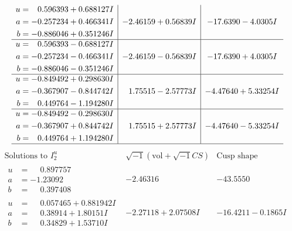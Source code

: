 \documentclass[1p]{elsarticle_modified}
\theoremstyle{definition}
\newcommand{\I}{\sqrt{-1}}
\begin{document}
$$\begin{array}{c|c|c}
\begin{aligned}
u &= \phantom{-}0.596393 + 0.688127 I \\
a &= -0.257234 + 0.466341 I \\
b &= -0.886046 + 0.351246 I\end{aligned}
 & -2.46159 + 0.56839 I & -17.6390 - 4.0305 I \\ \hline\begin{aligned}
u &= \phantom{-}0.596393 - 0.688127 I \\
a &= -0.257234 - 0.466341 I \\
b &= -0.886046 - 0.351246 I\end{aligned}
 & -2.46159 - 0.56839 I & -17.6390 + 4.0305 I \\ \hline\begin{aligned}
u &= -0.849492 + 0.298630 I \\
a &= -0.367907 - 0.844742 I \\
b &= \phantom{-}0.449764 - 1.194280 I\end{aligned}
 & \phantom{-}1.75515 - 2.57773 I & -4.47640 + 5.33254 I \\ \hline\begin{aligned}
u &= -0.849492 - 0.298630 I \\
a &= -0.367907 + 0.844742 I \\
b &= \phantom{-}0.449764 + 1.194280 I\end{aligned}
 & \phantom{-}1.75515 + 2.57773 I & -4.47640 - 5.33254 I\\
 \hline 
 \end{array}$$\newpage$$\begin{array}{c|c|c}  
\text{Solutions to }I^u_{2}& \I (\text{vol} + \sqrt{-1}CS) & \text{Cusp shape}\\
 \hline 
\begin{aligned}
u &= \phantom{-}0.897757\phantom{ +0.000000I} \\
a &= -1.23092\phantom{ +0.000000I} \\
b &= \phantom{-}0.397408\phantom{ +0.000000I}\end{aligned}
 & -2.46316\phantom{ +0.000000I} & -43.5550\phantom{ +0.000000I} \\ \hline\begin{aligned}
u &= \phantom{-}0.057465 + 0.881942 I \\
a &= \phantom{-}0.38914 + 1.80151 I \\
b &= \phantom{-}0.34829 + 1.53710 I\end{aligned}
 & -2.27118 + 2.07508 I & -16.4211 - 0.1865 I \\ \hline\begin{aligned}

\end{aligned}
\end{array}$$
\end{document}
